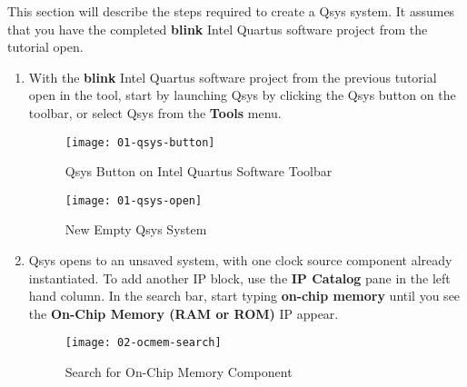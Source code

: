 \begin{flushleft}
\noindent

This section will describe the steps required to create a Qsys system.  It assumes that you have the completed \textbf{blink} Intel Quartus software project from the  tutorial open.

\begin{enumerate}[
	label=\textbf{Step \arabic*.},
	leftmargin=*,
	widest={00},
	align=left]

\item With the \textbf{blink} Intel Quartus software project from the previous tutorial open in the tool, start by launching Qsys by clicking the Qsys button on the toolbar, or select Qsys from the \textbf{Tools} menu.

\begin{figure}[H]
\centering
\texttt{[image: 01-qsys-button]}
\caption{Qsys Button on Intel Quartus Software Toolbar}
\label{fig:01-qsys-button}
\end{figure}

\begin{figure}[H]
\centering
\texttt{[image: 01-qsys-open]}
\caption{New Empty Qsys System}
\label{fig:01-qsys-open}
\end{figure}

\newpage

\item Qsys opens to an unsaved system, with one clock source component already instantiated.  To add another IP block, use the \textbf{IP Catalog} pane in the left hand column.  In the search bar, start typing \textbf{on-chip memory} until you see the \textbf{On-Chip Memory (RAM or ROM)} IP appear.

\begin{figure}[H]
\centering
\texttt{[image: 02-ocmem-search]}
\caption{Search for On-Chip Memory Component}
\label{fig:02-ocmem-search}
\end{figure}


\end{enumerate}
\end{flushleft}
